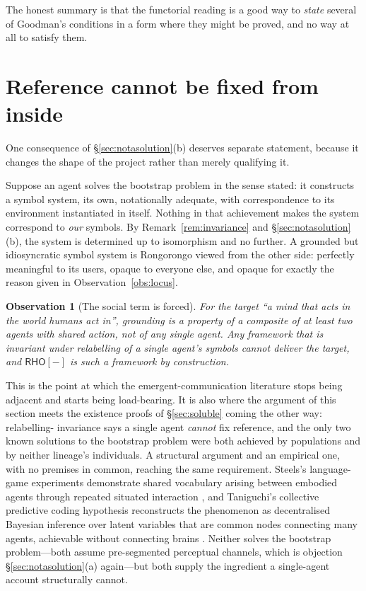 \documentclass[11pt,a4paper]{article}
\theoremstyle{definition}
\theoremstyle{plain}
\newtheorem{observation}[definition]{Observation}
\theoremstyle{remark}
\newcommand{\RHO}{\mathsf{RHO}}
\begin{document}
\noindent The honest summary is that the functorial reading is a good way to \emph{state}
several of Goodman's conditions in a form where they might be proved, and no way at all to
satisfy them.

\section{Reference cannot be fixed from inside}
\label{sec:social}

One consequence of \S\ref{sec:notasolution}(b) deserves separate statement, because it
changes the shape of the project rather than merely qualifying it.

Suppose an agent solves the bootstrap problem in the sense stated: it constructs a symbol
system, its own, notationally adequate, with correspondence to its environment
instantiated in itself. Nothing in that achievement makes the system correspond to
\emph{our} symbols. By Remark~\ref{rem:invariance} and \S\ref{sec:notasolution}(b), the
system is determined up to isomorphism and no further. A grounded but idiosyncratic symbol
system is Rongorongo viewed from the other side: perfectly meaningful to its users,
opaque to everyone else, and opaque for exactly the reason given in
Observation~\ref{obs:locus}.

\begin{observation}[The social term is forced]
\label{obs:social}
For the target ``a mind that acts in the world humans act in'', grounding is a property of
a composite of at least two agents with shared action, not of any single agent. Any
framework that is invariant under relabelling of a single agent's symbols cannot deliver
the target, and $\RHO[-]$ is such a framework by construction.
\end{observation}

\noindent This is the point at which the emergent-communication literature stops being
adjacent and starts being load-bearing. It is also where the argument of this section
meets the existence proofs of \S\ref{sec:soluble} coming the other way: relabelling-%
invariance says a single agent \emph{cannot} fix reference, and the only two known
solutions to the bootstrap problem were both achieved by populations and by neither
lineage's individuals. A structural argument and an empirical one, with no premises in
common, reaching the same requirement. Steels's language-game experiments demonstrate
shared vocabulary arising between embodied agents through repeated situated interaction
\cite{steels2015}, and Taniguchi's collective predictive coding hypothesis reconstructs
the phenomenon as decentralised Bayesian inference over latent variables that are common
nodes connecting many agents, achievable without connecting brains
\cite{taniguchi2024}. Neither solves the bootstrap problem---both assume pre-segmented
perceptual channels, which is objection \S\ref{sec:notasolution}(a) again---but both
supply the ingredient a single-agent account structurally cannot.
\end{document}
